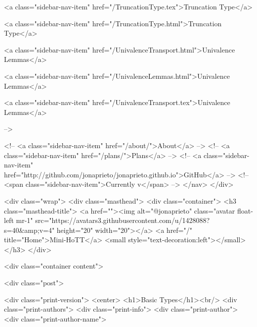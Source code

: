       
    
      
        
          <a class="sidebar-nav-item" href="/TruncationType.tex">Truncation Type</a>
        
      
    
      
        
          <a class="sidebar-nav-item" href="/TruncationType.html">Truncation Type</a>
        
      
    
      
        
          <a class="sidebar-nav-item" href="/UnivalenceTransport.html">Univalence Lemmas</a>
        
      
    
      
        
          <a class="sidebar-nav-item" href="/UnivalenceLemmas.html">Univalence Lemmas</a>
        
      
    
      
        
          <a class="sidebar-nav-item" href="/UnivalenceTransport.tex">Univalence Lemmas</a>
        
      
     -->

    <!-- <a class="sidebar-nav-item" href="/about/">About</a> -->
    <!-- <a class="sidebar-nav-item" href="/plans/">Plans</a> -->
    <!-- <a class="sidebar-nav-item" href="http://github.com/jonaprieto/jonaprieto.github.io">GitHub</a> -->
    <!-- <span class="sidebar-nav-item">Currently v</span> -->
  </nav>
</div>

    <div class="wrap">
      <div class="masthead">
        <div class="container">
          <h3 class="masthead-title">
            <a href=""><img alt="@jonaprieto" class="avatar float-left mr-1" src="https://avatars3.githubusercontent.com/u/1428088?s=40&amp;v=4" height="20" width="20"></a>
            <a href="/" title="Home">Mini-HoTT</a>
            <small style="text-decoration:left"></small>
          </h3>
        </div>
      
      <div class="container content">
        







<div class="post">

  <div class="print-version">
    <center>
      <h1>Basic Types</h1><br/>
        <div class="print-authors">
          <div class="print-info">
            <div class="print-author">
              <div class="print-author-name">
                
